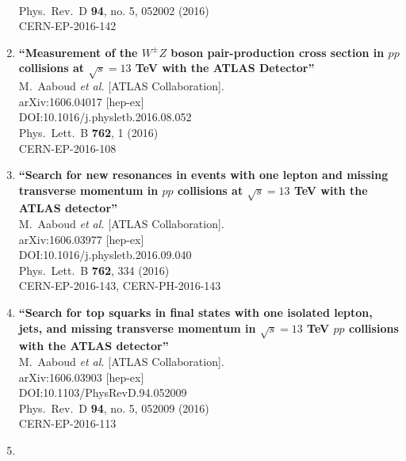 \documentclass{article}
\begin{document}
\begin{enumerate}
  \\{}Phys.\ Rev.\ D {\bf 94}, no. 5, 052002 (2016)
  \\{}CERN-EP-2016-142
\item%
{\bf ``Measurement of the $W^{\pm}Z$ boson pair-production cross section in $pp$ collisions at $\sqrt{s}=13$ TeV with the ATLAS Detector''}
  \\{}M.~Aaboud {\it et al.} [ATLAS Collaboration].
  \\{}arXiv:1606.04017 [hep-ex]
  \\{}DOI:10.1016/j.physletb.2016.08.052
  \\{}Phys.\ Lett.\ B {\bf 762}, 1 (2016)
  \\{}CERN-EP-2016-108
\item%
{\bf ``Search for new resonances in events with one lepton and missing transverse momentum in $pp$ collisions at $\sqrt{s} = 13$ TeV with the ATLAS detector''}
  \\{}M.~Aaboud {\it et al.} [ATLAS Collaboration].
  \\{}arXiv:1606.03977 [hep-ex]
  \\{}DOI:10.1016/j.physletb.2016.09.040
  \\{}Phys.\ Lett.\ B {\bf 762}, 334 (2016)
  \\{}CERN-EP-2016-143, CERN-PH-2016-143
\item%
{\bf ``Search for top squarks in final states with one isolated lepton, jets, and missing transverse momentum in $\sqrt{s}=13$ TeV $pp$ collisions with the ATLAS detector''}
  \\{}M.~Aaboud {\it et al.} [ATLAS Collaboration].
  \\{}arXiv:1606.03903 [hep-ex]
  \\{}DOI:10.1103/PhysRevD.94.052009
  \\{}Phys.\ Rev.\ D {\bf 94}, no. 5, 052009 (2016)
  \\{}CERN-EP-2016-113
\item%

\end{enumerate}
\end{document}
